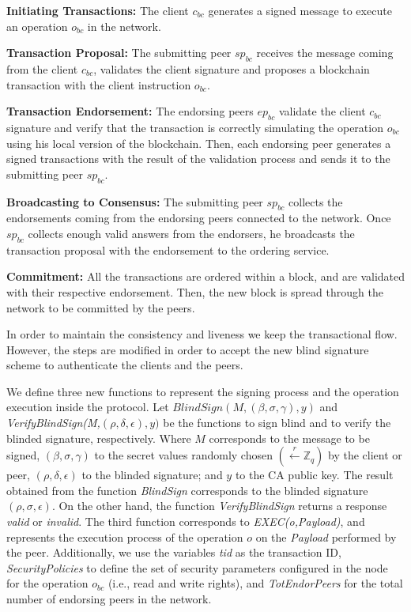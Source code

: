 \documentclass[conference]{llncs}
\begin{document}
\begin{compactenum}
    \item \textbf{Initiating Transactions:} The client $c_{bc}$ generates a signed message to execute an operation $o_{bc}$ in the network.
    \item \textbf{Transaction Proposal:} The submitting peer $sp_{bc}$ receives the message coming from the client $c_{bc}$, validates the client signature and proposes a blockchain transaction with the client instruction $o_{bc}$.
    \item \textbf{Transaction Endorsement:} The endorsing peers $ep_{bc}$ validate the client $c_{bc}$ signature and verify that the transaction is correctly simulating the operation $o_{bc}$ using his local version of the blockchain. Then, each endorsing peer generates a signed transactions with the result of the validation process and sends it to the submitting peer $sp_{bc}$.
    \item \textbf{Broadcasting to Consensus:} The submitting peer $sp_{bc}$ collects the endorsements coming from the endorsing peers connected to the network. Once $sp_{bc}$ collects enough valid answers from the endorsers, he broadcasts the transaction proposal with the endorsement to the ordering service.
    \item \textbf{Commitment:} All the transactions are ordered within a block, and are validated with their respective endorsement. Then, the new block is spread through the network to be committed by the peers.
\end{compactenum}

In order to maintain the consistency and liveness we keep the transactional flow. However, the steps are modified in order to accept the new blind signature scheme to authenticate the clients and the peers.

We define three new functions to represent the signing process and the operation execution inside the protocol. Let $BlindSign(M,(\beta,\sigma,\gamma),y)$ and \textit{VerifyBlindSign(M,}$(\rho,\delta,\epsilon),y)$ be the functions to sign blind and to verify the blinded signature, respectively. Where $M$ corresponds to the message to be signed, $(\beta,\sigma,\gamma)$ to the secret values randomly chosen $(\xleftarrow[]{r}\mathbb{Z}_q)$ by the client or peer, $(\rho,\delta,\epsilon)$ to the blinded signature; and $y$ to the CA public key. The result obtained from the function \textit{BlindSign} corresponds to the blinded signature $(\rho,\sigma,\epsilon)$. On the other hand, the function \textit{VerifyBlindSign} returns a response \textit{valid} or \textit{invalid}. The third function corresponds to \textit{EXEC(o,Payload)}, and represents the execution process of the operation $o$ on the \textit{Payload} performed by the peer. Additionally, we use the variables \textit{tid} as the transaction ID, \textit{SecurityPolicies} to define the set of security parameters configured in the node for the operation $o_{bc}$ (i.e., read and write rights), and \textit{TotEndorPeers} for the total number of endorsing peers in the network.
\end{document}
